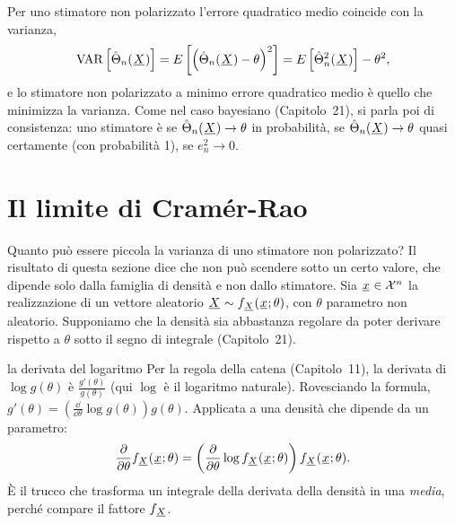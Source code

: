Per uno stimatore non polarizzato l'errore quadratico medio coincide con la varianza,
\[ \mathrm{VAR}\left[ \hat\Theta_n({\mkern1mu\underline{X}\mkern1mu}) \right] = E\left[ \left( \hat\Theta_n({\mkern1mu\underline{X}\mkern1mu}) - \theta \right)^2 \right]
   = E\left[ \hat\Theta_n^2({\mkern1mu\underline{X}\mkern1mu}) \right] - \theta^2 , \]
e lo stimatore non polarizzato a minimo errore quadratico medio è quello che minimizza la varianza. Come nel caso
bayesiano (Capitolo~21), si parla poi di consistenza: uno stimatore è  se
$\hat\Theta_n({\mkern1mu\underline{X}\mkern1mu}) \to \theta$ in probabilità,  se $\hat\Theta_n({\mkern1mu\underline{X}\mkern1mu}) \to
\theta$ quasi certamente (con probabilità 1),  se $e_n^2 \to 0$.

\section{Il limite di Cramér-Rao}

Quanto può essere piccola la varianza di uno stimatore non polarizzato? Il risultato di questa sezione dice che non può
scendere sotto un certo valore, che dipende solo dalla famiglia di densità e non dallo stimatore. Sia ${\mkern1mu\underline{x}\mkern1mu} \in
\mathcal{X}^n$ la realizzazione di un vettore aleatorio ${\mkern1mu\underline{X}\mkern1mu} \sim f_{{\mkern1mu\underline{X}\mkern1mu}}({\mkern1mu\underline{x}\mkern1mu}; \theta)$, con $\theta$
parametro non aleatorio. Supponiamo che la densità sia abbastanza regolare da poter derivare rispetto a $\theta$ sotto
il segno di integrale (Capitolo~21).

\begin{richiamo}{la derivata del logaritmo}
Per la regola della catena (Capitolo~11), la derivata di $\log g(\theta)$ è $\frac{g'(\theta)}{g(\theta)}$ (qui
$\log$ è il logaritmo naturale). Rovesciando la formula, $g'(\theta) = \left( \frac{\dd}{\dd\theta} \log g(\theta)
\right) g(\theta)$. Applicata a una densità che dipende da un parametro:
\[ \frac{\partial}{\partial\theta} f_{{\mkern1mu\underline{X}\mkern1mu}}({\mkern1mu\underline{x}\mkern1mu}; \theta) = \left( \frac{\partial}{\partial\theta} \log
   f_{{\mkern1mu\underline{X}\mkern1mu}}({\mkern1mu\underline{x}\mkern1mu}; \theta) \right) f_{{\mkern1mu\underline{X}\mkern1mu}}({\mkern1mu\underline{x}\mkern1mu}; \theta) . \]
È il trucco che trasforma un integrale della derivata della densità in una \emph{media}, perché compare il fattore
$f_{{\mkern1mu\underline{X}\mkern1mu}}$.
\end{richiamo}


